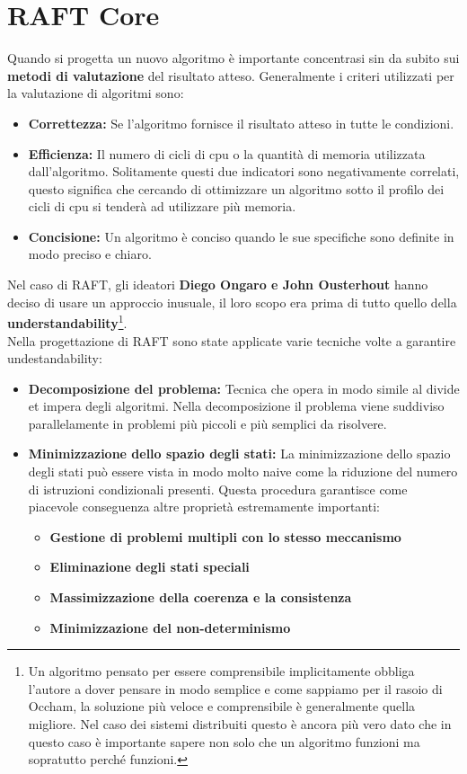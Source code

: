	\section{RAFT Core}
    Quando si progetta un nuovo algoritmo è importante concentrasi sin da subito sui \textbf{metodi di valutazione} del risultato atteso. Generalmente i criteri utilizzati per la valutazione di algoritmi sono: 
    \begin{itemize}
      \item{\textbf{Correttezza:}}
      Se l'algoritmo fornisce il risultato atteso in tutte le condizioni.
      \item{\textbf{Efficienza:}}
      Il numero di cicli di cpu o la quantità di memoria utilizzata dall'algoritmo. Solitamente questi due indicatori sono negativamente correlati, questo significa che cercando di ottimizzare un algoritmo sotto il profilo dei cicli di cpu si tenderà ad utilizzare più memoria.
      \item{\textbf{Concisione:}}
      Un algoritmo è conciso quando le sue specifiche sono definite in modo preciso e chiaro.
    \end{itemize}
    Nel caso di RAFT, gli ideatori \textbf{Diego Ongaro e John Ousterhout} \cite[raftPaper]{raftPaper} \cite[ongaro:2014]{ongaro:2014} hanno deciso di usare un approccio inusuale, il loro scopo era prima di tutto quello della \textbf{understandability}\footnote{Un algoritmo pensato per essere comprensibile implicitamente obbliga l'autore a dover pensare in modo semplice e come sappiamo per il rasoio di Occham, la soluzione più veloce e comprensibile è generalmente quella migliore. Nel caso dei sistemi distribuiti questo è ancora più vero dato che in questo caso è importante sapere non solo che un algoritmo funzioni ma sopratutto perché funzioni.}.\\
    Nella progettazione di RAFT sono state applicate varie tecniche volte a garantire undestandability:
    \begin{itemize}
      \item{\textbf{Decomposizione del problema:}}
      Tecnica che opera in modo simile al divide et impera degli algoritmi. Nella decomposizione il problema viene suddiviso parallelamente in problemi più piccoli e più semplici da risolvere.
      \item{\textbf{Minimizzazione dello spazio degli stati:}}
      La minimizzazione dello spazio degli stati può essere vista in modo molto naive come la riduzione del numero di istruzioni condizionali presenti. Questa procedura garantisce come piacevole conseguenza altre proprietà estremamente importanti:
      \begin{itemize}
        \item{\textbf{Gestione di problemi multipli con lo stesso meccanismo}}
        \item{\textbf{Eliminazione degli stati speciali}}
        \item{\textbf{Massimizzazione della coerenza e la consistenza}}
        \item{\textbf{Minimizzazione del non-determinismo}}
      \end{itemize}
    \end{itemize}
